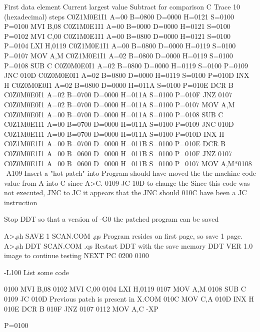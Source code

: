                             First data element
                                   Current largest value
                                          Subtract for comparison C
    Trace 10 (hexadecimal) steps
C0Z1M0E1I1 A=00 B=0800 D=0000 H=0121 S=0100 P=0100 MVI B,08
C0Z1M0E1I1 A=00 B=0000 D=0000 H=0121 S=0100 P=0102 MVI C,00
C0Z1M0E1I1 A=00 B=0800 D=0000 H=0121 S=0100 P=0104 LXI H,0119
C0Z1M0E1I1 A=00 B=0800 D=0000 H=0119 S=0100 P=0107 MOV A,M
C0Z1M0E1I1 A=02 B=0800 D=0000 H=0119 S=0100 P=0108 SUB C
C0Z0M0E0I1 A=02 B=0800 D=0000 H=0119 S=0100 P=0109 JNC 010D
C0Z0M0E0I1 A=02 B=0800 D=0000 H=0119 S=0100 P=010D INX H
C0Z0M0E0I1 A=02 B=0800 D=0000 H=011A S=0100 P=010E DCR B
C0Z0M0E0I1 A=02 B=0700 D=0000 H=011A S=0100 P=010F JNZ 0107
C0Z0M0E0I1 A=02 B=0700 D=0000 H=011A S=0100 P=0107 MOV A,M
C0Z0M0E0I1 A=00 B=0700 D=0000 H=011A S=0100 P=0108 SUB C
C0Z1M0E1I1 A=00 B=0700 D=0000 H=011A S=0100 P=0109 JNC 010D
C0Z1M0E1I1 A=00 B=0700 D=0000 H=011A S=0100 P=010D INX H
C0Z1M0E1I1 A=00 B=0700 D=0000 H=011B S=0100 P=010E DCR B
C0Z0M0E1I1 A=00 B=0600 D=0000 H=011B S=0100 P=010F JNZ 0107
C0Z0M0E1I1 A=00 B=0600 D=0000 H=011B S=0100 P=0107 MOV A,M*0108
-A109
             Insert a "hot patch" into    Program should have moved the
             the machine code             value from A into C since A>C.
0109 JC 10D  to change the                Since this code was not executed,
             JNC to JC                    it appears that the JNC should
010C                                      have been a JC instruction
 
       Stop DDT so that a version of
-G0    the patched program can be saved

A>\c
.sh
SAVE 1 SCAN.COM  \c
.qs
Program resides on first 
                   page, so save 1 page.
A>\c
.sh
DDT SCAN.COM
.qs
                   Restart DDT with the save memory
DDT VER 1.0        image to continue testing
NEXT PC
0200 0100

-L100    List some code

 0100    MVI B,08
 0102    MVI C,00
 0104    LXI H,0119
 0107    MOV A,M
 0108    SUB C
 0109    JC  010D    Previous patch is present in X.COM
 010C    MOV C,A
 010D    INX H
 010E    DCR B
 010F    JNZ 0107
 0112    MOV A,C
 -XP

P=0100

